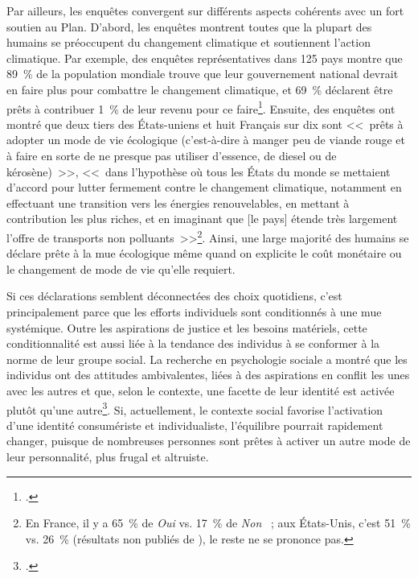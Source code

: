 \documentclass[a5paper,french,openany]{memoir}
\begin{document}
Par ailleurs, les enquêtes convergent sur différents aspects cohérents avec un fort soutien au Plan. D'abord, les enquêtes montrent toutes que la plupart des humains se préoccupent du changement climatique et soutiennent l'action climatique. Par exemple, des enquêtes représentatives dans 125 pays montre que 89~\% de la population mondiale trouve que leur gouvernement national devrait en faire plus pour combattre le changement climatique, et 69~\% déclarent être prêts à contribuer 1~\% de leur revenu pour ce faire\footnote{\cite{andre_globally_2024}.}. %
Ensuite, des enquêtes ont montré que deux tiers des États-uniens et huit Français sur dix sont <<~prêts à adopter un mode de vie écologique (c'est-à-dire à manger peu de viande rouge et à faire en sorte de ne presque pas utiliser d'essence, de diesel ou de
kérosène)~>>, <<~dans l'hypothèse où tous les États du monde se mettaient d'accord pour lutter fermement contre le changement climatique, notamment en effectuant une
transition vers les énergies renouvelables, en mettant à contribution les plus riches, et en imaginant que [le pays] étende très largement l'offre de transports non polluants~>>\footnote{En France, il y a 65~\% de \textit{Oui} vs. 17~\% de \textit{Non} \citep{douenne_french_2020}~; aux États-Unis, c'est 51~\% vs. 26~\% (résultats non publiés de \citealp{dechezlepretre_fighting_2022}), le reste ne se prononce pas.}. %
Ainsi, une large majorité des humains se déclare prête à la mue écologique même quand on explicite le coût monétaire ou le changement de mode de vie qu'elle requiert. 

Si ces déclarations semblent déconnectées des choix quotidiens, c'est principalement parce que les efforts individuels sont conditionnés à une mue systémique. Outre les aspirations de justice et les besoins matériels, cette conditionnalité est aussi liée à la tendance des individus à se conformer à la norme de leur groupe social. La recherche en psychologie sociale a montré que les individus ont des attitudes ambivalentes, liées à des aspirations en conflit les unes avec les autres et que, selon le contexte, une facette de leur identité est activée plutôt qu'une autre\footnote{\cite{fielding_social_2016,kim_normative_2012}.}. Si, actuellement, le contexte social favorise l'activation d'une identité consumériste et individualiste, l'équilibre pourrait rapidement changer, puisque de nombreuses personnes sont prêtes à activer un autre mode de leur personnalité, plus frugal et altruiste.
\end{document}
